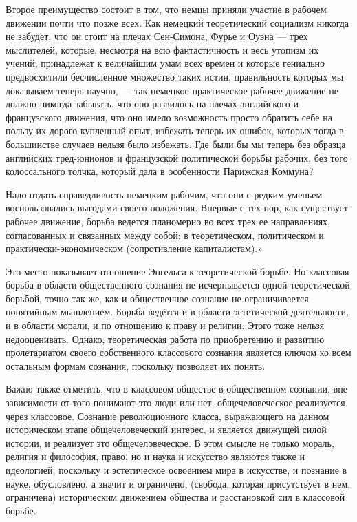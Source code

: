 \documentclass[../main]{subfiles}
\begin{document}
Второе преимущество состоит в том, что немцы приняли участие в рабочем движении почти что позже всех. Как немецкий теоретический социализм никогда не забудет, что он стоит на плечах Сен-Симона, Фурье и Оуэна — трех мыслителей, которые, несмотря на всю фантастичность и весь утопизм их учений, принадлежат к величайшим умам всех времен и которые гениально предвосхитили бесчисленное множество таких истин, правильность которых мы доказываем теперь научно, — так немецкое практическое рабочее движение не должно никогда забывать, что оно развилось на плечах английского и французского движения, что оно имело возможность просто обратить себе на пользу их дорого купленный опыт, избежать теперь их ошибок, которых тогда в большинстве случаев нельзя было избежать. Где были бы мы теперь без образца английских тред-юнионов и французской политической борьбы рабочих, без того колоссального толчка, который дала в особенности Парижская Коммуна?

Надо отдать справедливость немецким рабочим, что они с редким уменьем воспользовались выгодами своего положения. Впервые с тех пор, как существует рабочее движение, борьба ведется планомерно во всех трех ее направлениях, согласованных и связанных между собой: в теоретическом, политическом и практически-экономическом (сопротивление капиталистам).»

Это место показывает отношение Энгельса к теоретической борьбе. Но классовая борьба в области общественного сознания не исчерпывается одной теоретической борьбой, точно так же, как и общественное сознание не ограничивается понятийным мышлением. Борьба ведётся и в области эстетической деятельности, и в области морали, и по отношению к праву и религии. Этого тоже нельзя недооценивать. Однако, теоретическая работа по приобретению и развитию пролетариатом своего собственного классового сознания является ключом ко всем остальным формам сознания, поскольку позволяет их понять.

Важно также отметить, что в классовом обществе в общественном сознании, вне зависимости от того понимают это люди или нет, общечеловеческое реализуется через классовое. Сознание революционного класса, выражающего на данном историческом этапе общечеловеческий интерес, и является движущей силой истории, и реализует это общечеловеческое. В этом смысле не только мораль, религия и философия, право, но и наука и искусство являются также и идеологией, поскольку и эстетическое освоением мира в искусстве, и познание в науке, обусловлено, а значит и ограничено, (свобода, которая присутствует в нем, ограничена) историческим движением общества и расстановкой сил в классовой борьбе.
\end{document}
